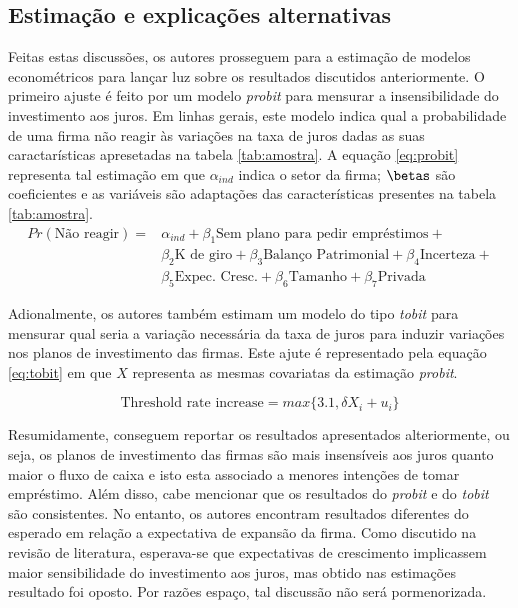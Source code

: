 \documentclass[11pt]{article}
\begin{document}
\subsection*{Estimação e explicações alternativas}
\label{sec:org476ad15}

Feitas estas discussões, os autores prosseguem para a estimação de modelos econométricos para lançar luz sobre os resultados discutidos anteriormente.
O primeiro ajuste é feito por um modelo \emph{probit} para mensurar a insensibilidade do investimento aos juros.
Em linhas gerais, este modelo indica qual a probabilidade de uma firma não reagir às variações na taxa de juros dadas as suas caractarísticas apresetadas na tabela \ref{tab:amostra}.
A equação \ref{eq:probit} representa tal estimação em que \(\alpha_{ind}\) indica o setor da firma; \(\betas\) são coeficientes e as variáveis são adaptações das características presentes na tabela \ref{tab:amostra}.
\begin{align*}
\label{eq:probit}
Pr(\text{Não reagir}) =& \alpha_{ind} + \beta_{1}\text{Sem plano para pedir empréstimos} + \\
& \beta_{2}\text{K de giro} + \beta_{3}\text{Balanço Patrimonial} + \beta_{4}\text{Incerteza} + \\
& \beta_{5}\text{Expec. Cresc.} + \beta_{6}\text{Tamanho} + \beta_{7}\text{Privada}
\end{align*}

Adionalmente, os autores também estimam um modelo do tipo \emph{tobit} para mensurar qual seria a variação necessária da taxa de juros para induzir variações nos planos de investimento das firmas. Este ajute é representado pela equação \ref{eq:tobit} em que \(X\) representa as mesmas covariatas da estimação \emph{probit}.

\begin{equation}
\label{eq:tobit}
\text{Threshold rate increase} = max\{3.1, \delta X_{i} + u_{i}\}
\end{equation}


Resumidamente, \textcite{sharpe_2020_Why} conseguem reportar os resultados apresentados alteriormente, ou seja, os planos de investimento das firmas são mais insensíveis aos juros quanto maior o fluxo de caixa e isto esta associado a menores intenções de tomar empréstimo.
Além disso, cabe mencionar que os resultados do \emph{probit} e do \emph{tobit} são consistentes.
No entanto, os autores encontram resultados diferentes do esperado em relação a expectativa de expansão da firma.
Como discutido na revisão de literatura, esperava-se que expectativas de crescimento implicassem maior sensibilidade do investimento aos juros, mas obtido nas estimações resultado foi oposto.
Por razões espaço, tal discussão não será pormenorizada.
\end{document}
